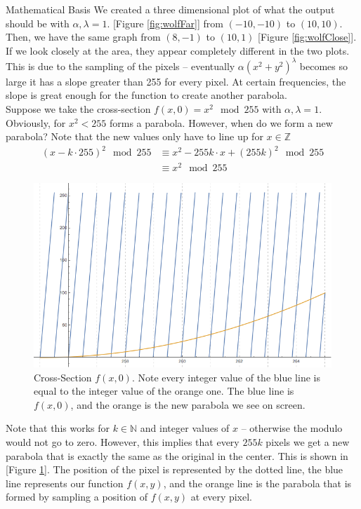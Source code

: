 \documentclass[11pt]{article}
\newcommand{\reffig}[1]{[Figure \ref{#1}]}
\begin{document}
\begin{section}{Mathematical Basis}
We created a three dimensional plot of what the output should be with $\alpha, \lambda = 1$. \reffig{fig:wolfFar} from $(-10, -10)$ to $(10, 10)$. Then, we have the same graph from $(8, -1)$ to $(10, 1)$ \reffig{fig:wolfClose}. If we look closely at the area, they appear completely different in the two plots. This is due to the sampling of the pixels -- eventually $\alpha (x^2 + y^2)^\lambda$ becomes so large it has a slope greater than 255 for every pixel. At certain frequencies, the slope is great enough for the function to create another parabola. \\

Suppose we take the cross-section $f(x, 0) = x^2\mod 255$ with $\alpha, \lambda = 1$. Obviously, for $x^2 < 255$ forms a parabola. However, when do we form a new parabola? Note that the new values only have to line up for $x\in \mathbb{Z}$
\begin{align*}
(x - k\cdot 255)^2 \mod 255 &\equiv x^2 - 255k\cdot x + (255k)^2 \mod 255\\
&\equiv x^2 \mod 255
\end{align*}

\begin{figure}[h]
\centering
\includegraphics[width=\textwidth]{parabola1.png}
\caption{Cross-Section $f(x, 0)$. Note every integer value of the blue line is equal to the integer value of the orange one. The blue line is $f(x, 0)$, and the orange is the new parabola we see on screen.}
\label{fig:parabola1}
\end{figure}

Note that this works for $k\in \mathbb{N}$ and integer values of $x$ -- otherwise the modulo would not go to zero. However, this implies that every $255k$ pixels we get a new parabola that is exactly the same as the original in the center. This is shown in \reffig{fig:parabola1}. The position of the pixel is represented by the dotted line, the blue line represents our function $f(x, y)$, and the orange line is the parabola that is formed by sampling a position of $f(x, y)$ at every pixel.\\


\end{section}
\end{document}
